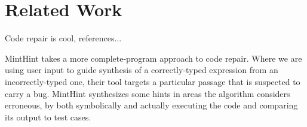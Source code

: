 \section{Related Work}
\label{sec:related}

Code repair is cool, references...

MintHint \cite{MintHint} takes a more complete-program approach to code repair. Where we are using user input to guide synthesis of a correctly-typed expression from an incorrectly-typed one, their tool targets a particular passage that is suspected to carry a bug. MintHint synthesizes some hints in areas the algorithm considers erroneous, by both symbolically and actually executing the code and comparing its output to test cases.
